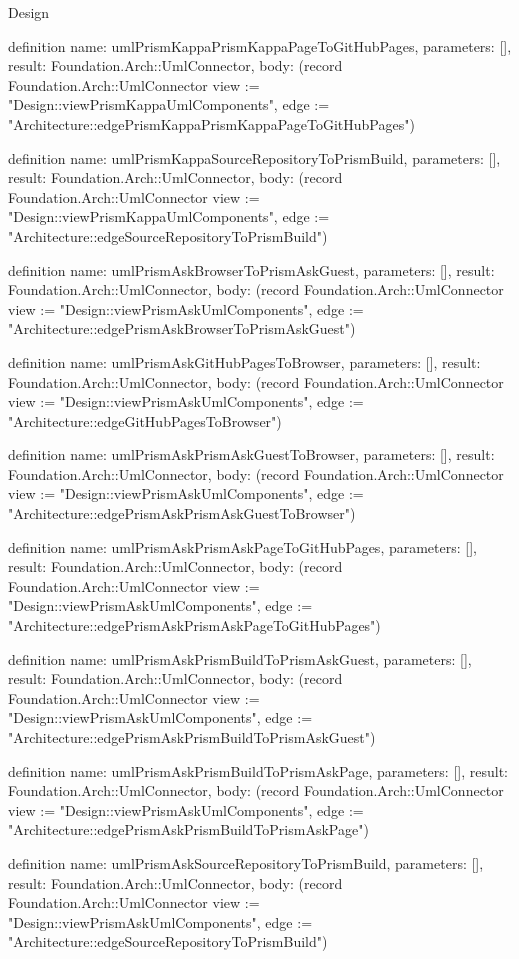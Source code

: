 \begin{lexlean}{Design}
\begin{semanticmodule}
definition{
  name: umlPrismKappaPrismKappaPageToGitHubPages,
  parameters: [],
  result: Foundation.Arch::UmlConnector,
  body: (record Foundation.Arch::UmlConnector {view := "Design::viewPrismKappaUmlComponents", edge := "Architecture::edgePrismKappaPrismKappaPageToGitHubPages"})
}

definition{
  name: umlPrismKappaSourceRepositoryToPrismBuild,
  parameters: [],
  result: Foundation.Arch::UmlConnector,
  body: (record Foundation.Arch::UmlConnector {view := "Design::viewPrismKappaUmlComponents", edge := "Architecture::edgeSourceRepositoryToPrismBuild"})
}

definition{
  name: umlPrismAskBrowserToPrismAskGuest,
  parameters: [],
  result: Foundation.Arch::UmlConnector,
  body: (record Foundation.Arch::UmlConnector {view := "Design::viewPrismAskUmlComponents", edge := "Architecture::edgePrismAskBrowserToPrismAskGuest"})
}

definition{
  name: umlPrismAskGitHubPagesToBrowser,
  parameters: [],
  result: Foundation.Arch::UmlConnector,
  body: (record Foundation.Arch::UmlConnector {view := "Design::viewPrismAskUmlComponents", edge := "Architecture::edgeGitHubPagesToBrowser"})
}

definition{
  name: umlPrismAskPrismAskGuestToBrowser,
  parameters: [],
  result: Foundation.Arch::UmlConnector,
  body: (record Foundation.Arch::UmlConnector {view := "Design::viewPrismAskUmlComponents", edge := "Architecture::edgePrismAskPrismAskGuestToBrowser"})
}

definition{
  name: umlPrismAskPrismAskPageToGitHubPages,
  parameters: [],
  result: Foundation.Arch::UmlConnector,
  body: (record Foundation.Arch::UmlConnector {view := "Design::viewPrismAskUmlComponents", edge := "Architecture::edgePrismAskPrismAskPageToGitHubPages"})
}

definition{
  name: umlPrismAskPrismBuildToPrismAskGuest,
  parameters: [],
  result: Foundation.Arch::UmlConnector,
  body: (record Foundation.Arch::UmlConnector {view := "Design::viewPrismAskUmlComponents", edge := "Architecture::edgePrismAskPrismBuildToPrismAskGuest"})
}

definition{
  name: umlPrismAskPrismBuildToPrismAskPage,
  parameters: [],
  result: Foundation.Arch::UmlConnector,
  body: (record Foundation.Arch::UmlConnector {view := "Design::viewPrismAskUmlComponents", edge := "Architecture::edgePrismAskPrismBuildToPrismAskPage"})
}

definition{
  name: umlPrismAskSourceRepositoryToPrismBuild,
  parameters: [],
  result: Foundation.Arch::UmlConnector,
  body: (record Foundation.Arch::UmlConnector {view := "Design::viewPrismAskUmlComponents", edge := "Architecture::edgeSourceRepositoryToPrismBuild"})
}


\end{semanticmodule}
\end{lexlean}
